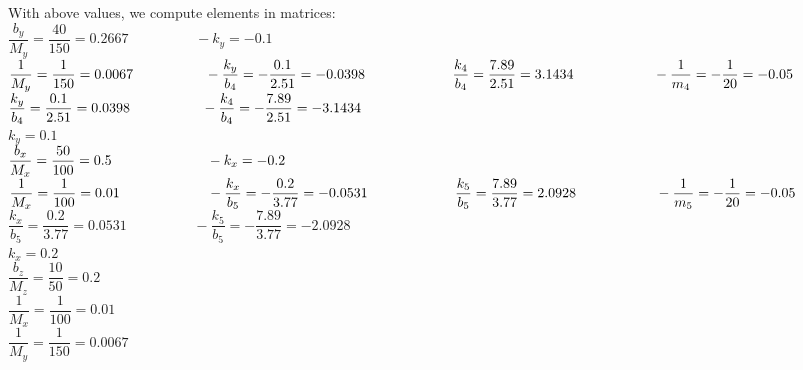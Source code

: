 \documentclass[14pt,a4paper]{article}
\begin{document}
	With above values, we compute elements in matrices: \\
	\hspace*{2cm} $ \dfrac{b_y}{M_y} = \dfrac{40}{150} = 0.2667 \hspace{2cm} -k_y = -0.1$ \\
	\hspace*{2cm} $ \dfrac{1}{M_y} = \dfrac{1}{150} = 0.0067  \hspace{1.8cm} -\dfrac{k_y}{b_4} = -\dfrac{0.1}{2.51} = -0.0398 \\
	\hspace*{2.2cm} \dfrac{k_4}{b_4} = \dfrac{7.89}{2.51} = 3.1434  \hspace{2cm} -\dfrac{1}{m_4} = -\dfrac{1}{20} = -0.05 $ \\
	\hspace*{2cm} $ \dfrac{k_y}{b_4} = \dfrac{0.1}{2.51} = 0.0398  \hspace{1.8cm} -\dfrac{k_4}{b_4} = -\dfrac{7.89}{2.51} = -3.1434 $\\
	\hspace*{2cm} $ k_y = 0.1 $ \\
	\hspace*{2cm} $ \dfrac{b_x}{M_x} = \dfrac{50}{100} = 0.5 \hspace{2.4cm} -k_x = -0.2$ \\
	\hspace*{2cm} $ \dfrac{1}{M_x} = \dfrac{1}{100} = 0.01  \hspace{2.2cm} -\dfrac{k_x}{b_5} = -\dfrac{0.2}{3.77} = -0.0531 \\
	\hspace*{2.2cm} \dfrac{k_5}{b_5} = \dfrac{7.89}{3.77} = 2.0928  \hspace{2cm} -\dfrac{1}{m_5} = -\dfrac{1}{20} = -0.05 $ \\
	\hspace*{2cm} $ \dfrac{k_x}{b_5} = \dfrac{0.2}{3.77} = 0.0531  \hspace{2cm} -\dfrac{k_5}{b_5} = -\dfrac{7.89}{3.77} = -2.0928 $\\
	\hspace*{2cm} $ k_x = 0.2 $ \\
	\hspace*{2cm} $ \dfrac{b_z}{M_z} = \dfrac{10}{50} = 0.2 $ \\
	\hspace*{2cm} $ \dfrac{1}{M_x} = \dfrac{1}{100} = 0.01 $ \\
	\hspace*{2cm} $ \dfrac{1}{M_y} = \dfrac{1}{150} = 0.0067 $ \\
	
\end{document}
